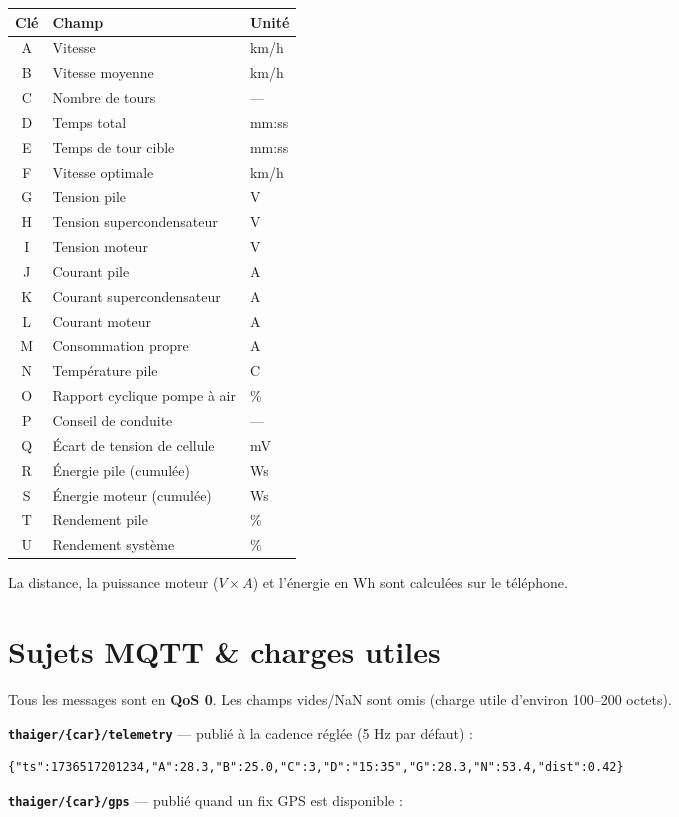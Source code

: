 \documentclass[11pt,a4paper,oneside]{report}
\newcommand{\degC}{\textdegree C}
\newcommand{\code}[1]{\texttt{#1}}
\begin{document}
\begin{tabularx}{\linewidth}{@{}clL@{}}
\toprule
\textbf{Clé} & \textbf{Champ} & \textbf{Unité}\\
\midrule
A & Vitesse & km/h\\
B & Vitesse moyenne & km/h\\
C & Nombre de tours & ---\\
D & Temps total & mm:ss\\
E & Temps de tour cible & mm:ss\\
F & Vitesse optimale & km/h\\
G & Tension pile & V\\
H & Tension supercondensateur & V\\
I & Tension moteur & V\\
J & Courant pile & A\\
K & Courant supercondensateur & A\\
L & Courant moteur & A\\
M & Consommation propre & A\\
N & Température pile & \degC{}\\
O & Rapport cyclique pompe à air & \%\\
P & Conseil de conduite & ---\\
Q & Écart de tension de cellule & mV\\
R & Énergie pile (cumulée) & Ws\\
S & Énergie moteur (cumulée) & Ws\\
T & Rendement pile & \%\\
U & Rendement système & \%\\
\bottomrule
\end{tabularx}

\medskip
La distance, la puissance moteur ($V \times A$) et l'énergie en Wh sont calculées sur
le téléphone.

\section{Sujets MQTT \& charges utiles}
Tous les messages sont en \textbf{QoS 0}. Les champs vides/NaN sont omis (charge
utile d'environ 100--200 octets).

\noindent\textbf{\code{thaiger/\{car\}/telemetry}} --- publié à la cadence réglée
(5 Hz par défaut) :

\begin{lstlisting}
{"ts":1736517201234,"A":28.3,"B":25.0,"C":3,"D":"15:35","G":28.3,"N":53.4,"dist":0.42}
\end{lstlisting}
\noindent\textbf{\code{thaiger/\{car\}/gps}} --- publié quand un fix GPS est
disponible :
\end{document}
